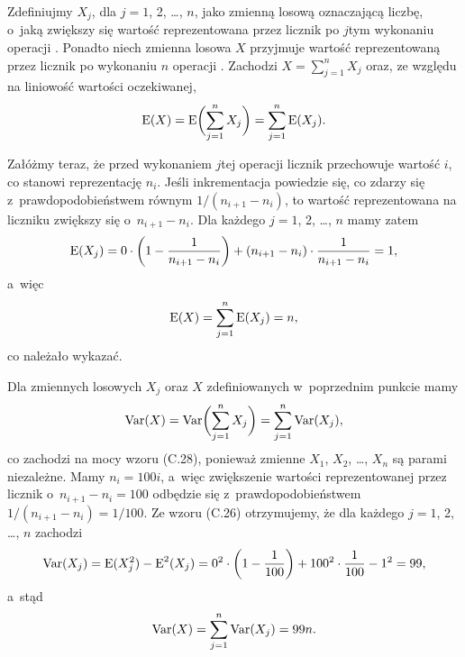 
\subproblem %
Zdefiniujmy $X_j$, dla $j=1$, 2, \dots, $n$, jako zmienną losową oznaczającą liczbę, o~jaką zwiększy się wartość reprezentowana przez licznik po $j$\nbhyphen tym wykonaniu operacji .
Ponadto niech zmienna losowa $X$ przyjmuje wartość reprezentowaną przez licznik po wykonaniu $n$ operacji .
Zachodzi $X=\sum_{j=1}^nX_j$ oraz, ze względu na liniowość wartości oczekiwanej,
\[
	\operatorname{E}(X) = \operatorname{E}\biggl(\sum_{j=1}^nX_j\biggr) = \sum_{j=1}^n\operatorname{E}(X_j).
\]

Załóżmy teraz, że przed wykonaniem $j$\nbhyphen tej operacji  licznik przechowuje wartość $i$, co stanowi reprezentację $n_i$.
Jeśli inkrementacja powiedzie się, co zdarzy się z~prawdopodobieństwem równym $1/(n_{i+1}-n_i)$, to wartość reprezentowana na liczniku zwiększy się o~$n_{i+1}-n_i$.
Dla każdego $j=1$, 2, \dots, $n$ mamy zatem
\[
	\operatorname{E}(X_j) = 0\cdot\biggl(1-\frac{1}{n_{i+1}-n_i}\biggr)+(n_{i+1}-n_i)\cdot\frac{1}{n_{i+1}-n_i} = 1,
\]
a~więc
\[
	\operatorname{E}(X) = \sum_{j=1}^n\operatorname{E}(X_j) = n,
\]
co należało wykazać.

\subproblem %
Dla zmiennych losowych $X_j$ oraz $X$ zdefiniowanych w~poprzednim punkcie mamy
\[
	\operatorname{Var}(X) = \operatorname{Var}\biggl(\sum_{j=1}^nX_j\biggr) = \sum_{j=1}^n\operatorname{Var}(X_j),
\]
co zachodzi na mocy wzoru (C.28), ponieważ zmienne $X_1$, $X_2$, \dots, $X_n$ są parami niezależne.
Mamy $n_i=100i$, a~więc zwiększenie wartości reprezentowanej przez licznik o~$n_{i+1}-n_i=100$ odbędzie się z~prawdopodobieństwem $1/(n_{i+1}-n_i)=1/100$.
Ze wzoru (C.26) otrzymujemy, że dla każdego $j=1$, 2, \dots, $n$ zachodzi
\[
	\operatorname{Var}(X_j) = \operatorname{E}(X_j^2)-\operatorname{E}^2(X_j) = 0^2\cdot\biggl(1-\frac{1}{100}\biggr)+100^2\cdot\frac{1}{100}-1^2 = 99,
\]
a~stąd
\[
	\operatorname{Var}(X) = \sum_{j=1}^n\operatorname{Var}(X_j) = 99n.
\]
